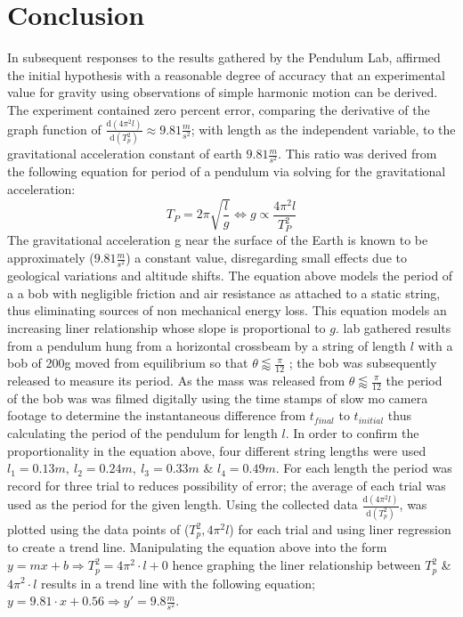 \documentclass[11pt,letterpaper]{article}
\begin{document}
\section{Conclusion}
In subsequent responses to the results gathered by the Pendulum Lab, affirmed the initial hypothesis with a reasonable degree of accuracy that an experimental value for gravity using observations of simple harmonic motion can be derived. The experiment contained zero percent error, comparing the derivative of the graph function of $\frac{\mathrm d (4\pi^2l) }{\mathrm d (T_{p}^2)} \approx 9.81 \frac{m}{s^2} $; with length as the independent variable, to the gravitational acceleration constant of earth $9.81 \frac{m}{s^2}$. This ratio was derived from the following equation for period of a pendulum via solving for the gravitational acceleration:$$T_{P}=2\pi \sqrt{\frac{l}{g}} \Longleftrightarrow g \propto \frac{4\pi ^2l}{T_{P}^2}$$
The gravitational acceleration g near the surface of the Earth is known to be approximately  ($9.81 \frac{m}{s^2}$) a constant value, disregarding small effects due to geological variations and altitude shifts. The equation above models the period of a a bob with negligible friction and air resistance as attached to a static string, thus eliminating sources of non mechanical energy loss. This equation models an increasing liner relationship whose slope is proportional to $g$.  lab gathered results from a pendulum hung from a horizontal crossbeam by a string of length $l$ with a bob of 200g moved from equilibrium so that $\theta \lessapprox \frac{\pi}{12}$ ; the bob was subsequently released to measure its period. As the mass was released from $\theta \lessapprox \frac{\pi}{12}$ the period of the bob was was filmed digitally using the time stamps of slow mo camera footage to determine the instantaneous difference from $t_{final}$ to $t_{initial}$ thus calculating the period of the pendulum for length $l$. In order to confirm the proportionality in the equation above, four different string lengths were used $l_{1}=0.13m,\ l_{2}=0.24m ,\ l_{3}=0.33m $ \& $l_{4}=0.49m$. For each length the period was record for three trial to reduces possibility of error; the average of each trial was used as the period for the given length. Using the collected data  $\frac{\mathrm d (4\pi^2l) }{\mathrm d (T_{p}^2)}$, was plotted using the data points of ($T_{p}^2, 4\pi^2l$) for each trial and using liner regression to create a trend line. Manipulating the equation above into  the form $y=mx+b \Rightarrow T_{p}^2=4\pi ^2\cdot l +0 $  hence graphing the liner relationship between $T_{p}^2$ \& $ 4\pi^2 \cdot l$  results in a trend line with the following equation; $y = 9.81 ·x + 0.56 \Rightarrow y'=9.8 \frac{m}{s^2}$. 
\end{document}
